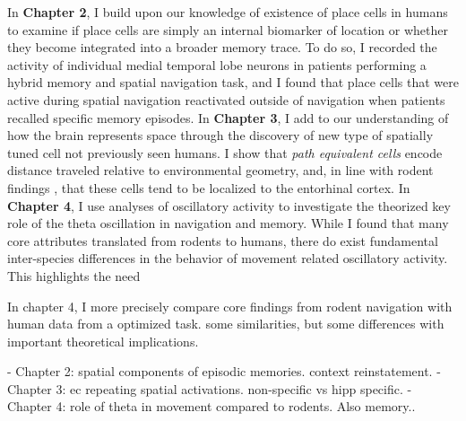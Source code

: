 In \textbf{Chapter 2}, I build upon our knowledge of existence of place cells in humans to examine if place cells are simply an internal biomarker of location or whether they become integrated into a broader memory trace. To do so, I recorded the activity of individual medial temporal lobe neurons in patients performing a hybrid memory and spatial navigation task, and I found that place cells that were active during spatial navigation reactivated outside of navigation when patients recalled specific memory episodes. In \textbf{Chapter 3}, I add to our understanding of how the brain represents space through the discovery of new type of spatially tuned cell not previously seen humans. I show that \textit{path equivalent cells} encode distance traveled relative to environmental geometry, and, in line with rodent findings \citep{FranEtal00}, that these cells tend to be localized to the entorhinal cortex. In \textbf{Chapter 4}, I use analyses of oscillatory activity to investigate the theorized key role of the theta oscillation in navigation and memory. While I found that many core attributes translated from rodents to humans, there do exist fundamental inter-species differences in the behavior of movement related oscillatory activity. This highlights the need


In chapter 4, I more precisely compare core findings from rodent navigation with human data from a optimized task. some similarities, but some differences with important theoretical implications.

- Chapter 2: spatial components of episodic memories. context reinstatement.
- Chapter 3: ec repeating spatial activations. non-specific vs hipp specific.
- Chapter 4: role of theta in movement compared to rodents. Also memory..
